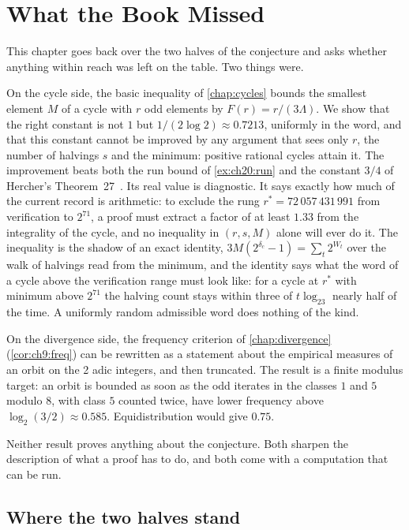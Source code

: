 \chapter{What the Book Missed}\label{chap:missed}

This chapter goes back over the two halves of the conjecture and asks whether anything within reach was left on the table. Two things were.

On the cycle side, the basic inequality of \cref{chap:cycles} bounds the smallest element $M$ of a cycle with $r$ odd elements by $F(r)=r/(3\Lambda)$. We show that the right constant is not $1$ but $1/(2\log 2)\approx 0.7213$, uniformly in the word, and that this constant cannot be improved by any argument that sees only $r$, the number of halvings $s$ and the minimum: positive rational cycles attain it. The improvement beats both the run bound of \cref{ex:ch20:run} and the constant $3/4$ of Hercher's Theorem~27~\cite{hercher2023}. Its real value is diagnostic. It says exactly how much of the current record is arithmetic: to exclude the rung $r^\ast=72\,057\,431\,991$ from verification to $2^{71}$, a proof must extract a factor of at least $1.33$ from the integrality of the cycle, and no inequality in $(r,s,M)$ alone will ever do it. The inequality is the shadow of an exact identity, $3M(2^{\delta_c}-1)=\sum_t2^{W_t}$ over the walk of halvings read from the minimum, and the identity says what the word of a cycle above the verification range must look like: for a cycle at $r^\ast$ with minimum above $2^{71}$ the halving count stays within three of $t\log_23$ nearly half of the time. A uniformly random admissible word does nothing of the kind.

On the divergence side, the frequency criterion of \cref{chap:divergence} (\cref{cor:ch9:freq}) can be rewritten as a statement about the empirical measures of an orbit on the 2 adic integers, and then truncated. The result is a finite modulus target: an orbit is bounded as soon as the odd iterates in the classes $1$ and $5$ modulo $8$, with class $5$ counted twice, have lower frequency above $\log_2(3/2)\approx 0.585$. Equidistribution would give $0.75$.

Neither result proves anything about the conjecture. Both sharpen the description of what a proof has to do, and both come with a computation that can be run.

\section{Where the two halves stand}\label{sec:ch20:stand}

